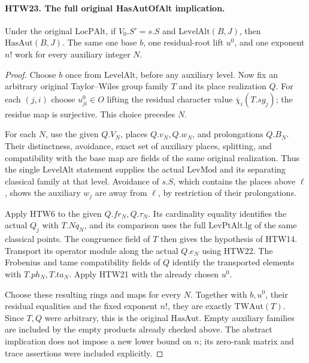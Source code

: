 \paragraph{HTW23. The full original HasAutOfAlt implication.}
\label{claim:HTW23}
Under the original \(\mathrm{LocPAlt}\), if
\(V_0.S'=s.S\) and \(\mathrm{LevelAlt}(B,J)\),
then \(\mathrm{HasAut}(B,J)\).  The same one
base \(b\), one residual-root lift \(u^0\), and
one exponent \(n!\) work for every auxiliary
integer \(N\).
\begin{proof}
Choose \(b\) once from \(\mathrm{LevelAlt}\),
before any auxiliary level.  Now fix an arbitrary
original Taylor--Wiles group family \(T\) and its
place realization \(Q\).  For each \((j,i)\)
choose \(u^0_{ji}\in O\) lifting the residual
character value \(\overline\chi_i(T.sg_j)\);
the residue map is surjective.  This choice
precedes \(N\).

For each \(N\), use the given \(Q.V_N\),
places \(Q.v_N,Q.w_N\), and prolongations \(Q.B_N\).
Their distinctness, avoidance, exact set of
auxiliary places, splitting, and compatibility
with the base map are fields of the same
original realization.  Thus the single
\(\mathrm{LevelAlt}\) statement supplies the
actual \(\mathrm{LevMod}\) and its separating
classical family at that level.  Avoidance of
\(s.S\), which contains the places above \(\ell\),
shows the auxiliary \(w_j\) are away from
\(\ell\), by restriction of their prolongations.

Apply HTW6 to the given \(Q.fr_N,Q.\tau_N\).
Its cardinality equality identifies the actual
\(Q_j\) with \(T.Nq_N\), and its comparison uses
the full \(\mathrm{LevPtAlt.lg}\) of the same
classical points.  The congruence field of \(T\)
then gives the hypothesis of HTW14.
Transport its operator module along the actual
\(Q.e_N\) using HTW22.  The Frobenius and tame
compatibility fields of \(Q\) identify the
transported elements with \(T.ph_N,T.ta_N\).
Apply HTW21 with the already chosen \(u^0\).

Choose these resulting rings and maps for every
\(N\).  Together with \(b,u^0\), their residual
equalities and the fixed exponent \(n!\), they
are exactly \(\mathrm{TWAut}(T)\).  Since \(T,Q\)
were arbitrary, this is the original
\(\mathrm{HasAut}\).  Empty auxiliary families
are included by the empty products already
checked above.  The abstract implication does
not impose a new lower bound on \(n\); its
zero-rank matrix and trace assertions were
included explicitly.
\end{proof}

